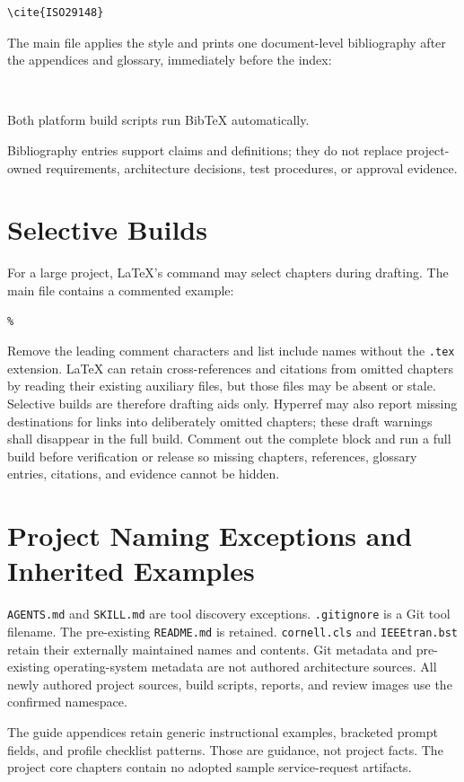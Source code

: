 \begin{verbatim}
\cite{ISO29148}
\end{verbatim}

The main file applies the style and prints one document-level bibliography after the appendices and glossary, immediately before the index:

\begin{verbatim}


\end{verbatim}

Both platform build scripts run BibTeX automatically.

Bibliography entries support claims and definitions; they do not replace
project-owned requirements, architecture decisions, test procedures, or
approval evidence.

\section{Selective Builds}

For a large project, LaTeX's \verb|| command may select chapters
during drafting. The main file contains a commented example:

\begin{verbatim}
% 
\end{verbatim}

Remove the leading comment characters and list include names without the
\texttt{.tex} extension. LaTeX can retain cross-references and citations from
omitted chapters by reading their existing auxiliary files, but those files
may be absent or stale. Selective builds are therefore drafting aids only.
Hyperref may also report missing destinations for links into deliberately
omitted chapters; these draft warnings shall disappear in the full build.
Comment out the complete \verb|| block and run a full build before
verification or release so missing chapters, references, glossary entries,
citations, and evidence cannot be hidden.

\section{Project Naming Exceptions and Inherited Examples}
\label{Section:ProjectNamingExceptions}
\texttt{AGENTS.md} and \texttt{SKILL.md} are tool discovery exceptions.
\texttt{.gitignore} is a Git tool filename. The pre-existing \texttt{README.md}
is retained. \texttt{cornell.cls} and \texttt{IEEEtran.bst} retain their externally
maintained names and contents. Git metadata and pre-existing operating-system
metadata are not authored architecture sources. All newly authored project
sources, build scripts, reports, and review images use the confirmed namespace.

The guide appendices retain generic instructional examples, bracketed prompt
fields, and profile checklist patterns. Those are guidance, not project facts.
The project core chapters contain no adopted sample service-request artifacts.
